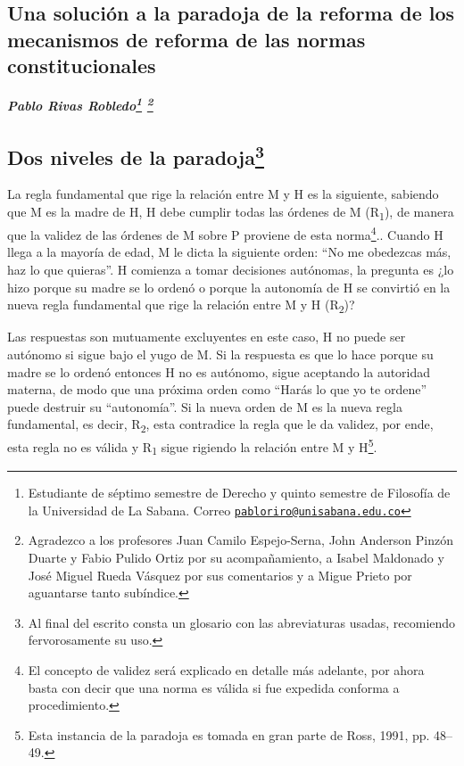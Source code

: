 \documentclass[]{book}
\newcommand{\autor}[1]{            %
  \begin{center}                   %
    \vspace*{-3.5em}               %
    \textbf{\textit{\large #1}}    %
    \vspace*{+4em}                 %
  \end{center}
}
\begin{document}
\begin{refsection}
\chapter{\texorpdfstring{\textbf{Una solución a la paradoja de la
reforma de los mecanismos de reforma de las normas
constitucionales}}{Una solución a la paradoja de la reforma de los mecanismos de reforma de las normas constitucionales}}\label{una-soluciuxf3n-a-la-paradoja-de-la-reforma-de-los-mecanismos-de-reforma-de-las-normas-constitucionales}

\autor{Pablo Rivas Robledo\footnote{Estudiante de séptimo semestre de
  Derecho y quinto semestre de Filosofía de la Universidad de La Sabana.
  Correo
  \href{mailto:pabloriro@unisabana.edu.co}{\nolinkurl{pabloriro@unisabana.edu.co}}} \footnote{Agradezco a los profesores Juan Camilo Espejo-Serna, John Anderson Pinzón Duarte y Fabio Pulido Ortiz por su acompañamiento, a Isabel Maldonado y José Miguel Rueda Vásquez por sus comentarios y a Migue Prieto por aguantarse tanto subíndice.}}

\section*{Dos niveles de la paradoja\footnote{Al final del escrito consta
		un glosario con las abreviaturas usadas, recomiendo fervorosamente su
		uso.}}

La regla fundamental que rige la relación entre M y H es la siguiente,
sabiendo que M es la madre de H, H debe cumplir todas las órdenes de M
(R\textsubscript{1}), de manera que la validez de las órdenes de M sobre
P proviene de esta norma\footnote{El concepto de validez será explicado
  en detalle más adelante, por ahora basta con decir que una norma es
  válida si fue expedida conforma a procedimiento.}.. Cuando H llega a
la mayoría de edad, M le dicta la siguiente orden: ``No me obedezcas
más, haz lo que quieras''. H comienza a tomar decisiones autónomas, la
pregunta es ¿lo hizo porque su madre se lo ordenó o porque la autonomía
de H se convirtió en la nueva regla fundamental que rige la relación
entre M y H (R\textsubscript{2})?

Las respuestas son mutuamente excluyentes en este caso, H no puede ser
autónomo si sigue bajo el yugo de M. Si la respuesta es que lo hace
porque su madre se lo ordenó entonces H no es autónomo, sigue aceptando
la autoridad materna, de modo que una próxima orden como ``Harás lo que
yo te ordene'' puede destruir su ``autonomía''. Si la nueva orden de M
es la nueva regla fundamental, es decir, R\textsubscript{2}, esta
contradice la regla que le da validez, por ende, esta regla no es
válida y R\textsubscript{1} sigue rigiendo la relación entre M y
H\footnote{Esta instancia de la paradoja es tomada en gran parte de
  Ross, 1991, pp. 48--49.}.


\end{refsection}
\end{document}
